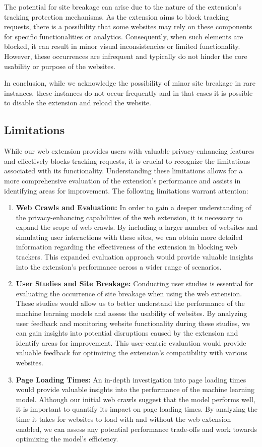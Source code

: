 The potential for site breakage can arise due to the nature of the extension's tracking protection mechanisms. As the extension
aims to block tracking requests, there is a possibility that some websites may rely
on these components for specific functionalities or analytics. Consequently, when such elements are blocked, it can result in
minor visual inconsistencies or limited functionality. However, these occurrences are infrequent and typically do not hinder
the core usability or purpose of the websites.

In conclusion, while we acknowledge the possibility of minor site breakage in rare instances, these instances do not occur frequently 
and in that cases it is possible to disable the extension and reload the website.
\subsection{Limitations}

While our web extension provides users with valuable privacy-enhancing features and effectively blocks tracking requests,
it is crucial to recognize the limitations associated with its functionality. Understanding these limitations allows for a more
comprehensive evaluation of the extension's performance and assists in identifying areas for improvement. The following limitations
warrant attention:
\begin{enumerate}
  \item{
    \textbf{Web Crawls and Evaluation:} In order to gain a deeper understanding of the privacy-enhancing capabilities
  of the web extension, it is necessary to expand the scope of web crawls. By including a larger number of websites and
simulating user interactions with these sites, we can obtain more detailed information regarding the effectiveness of the
extension in blocking web trackers. This expanded evaluation approach would provide valuable insights into the extension's
performance across a wider range of scenarios.}
  \item{
    \textbf{User Studies and Site Breakage:} Conducting user studies is essential for evaluating the occurrence
    of site breakage when using the web extension. These studies would allow us to better understand the performance
    of the machine learning models and assess the usability of websites. By analyzing user feedback and monitoring website
    functionality during these studies, we can gain insights into potential disruptions caused by the extension and identify
    areas for improvement. This user-centric evaluation would provide valuable feedback for optimizing the extension's compatibility
    with various websites.
    }
  \item{
    \textbf{Page Loading Times:} An in-depth investigation into page loading times would provide valuable insights into the
    performance of the machine learning model. Although our initial web crawls suggest that the model performs well, it is
    important to quantify its impact on page loading times. By analyzing the time it takes for websites to load with and without
    the web extension enabled, we can assess any potential performance trade-offs and work towards optimizing the model's efficiency.
    }
\end{enumerate}


